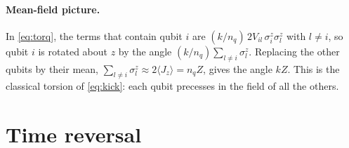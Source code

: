 \documentclass[11pt,a4paper]{article}
\begin{document}
\paragraph{Mean-field picture.}
In \cref{eq:torq}, the terms that contain qubit $i$ are $(k/n_q)\,2V_{il}\,\sigma^z_i\sigma^z_l$ with $l\ne i$, so qubit
$i$ is rotated about $z$ by the angle $(k/n_q)\sum_{l\ne i}\sigma^z_l$. Replacing the other qubits by their mean,
$\sum_{l\ne i}\sigma^z_l\approx 2\langle J_z\rangle = n_qZ$, gives the angle $kZ$. This is the classical torsion of
\cref{eq:kick}: each qubit precesses in the field of all the others.

\section{Time reversal}\label{sec:reversal}
\end{document}
